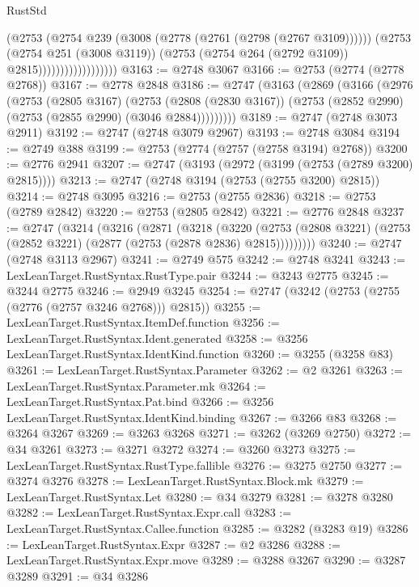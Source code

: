\begin{lexlean}{RustStd}
\begin{coremodule}
                                  (@2753
                                    (@2754 @239 (@3008 (@2778 (@2761 (@2798 (@2767 @3109))))))
                                    (@2753
                                      (@2754 @251 (@3008 @3119))
                                      (@2753 (@2754 @264 (@2792 @3109)) @2815))))))))))))))))))
@3163 := @2748 @3067
@3166 := @2753 (@2774 (@2778 @2768))
@3167 := @2778 @2848
@3186 := @2747
    (@3163
      (@2869
        (@3166
          (@2976
            (@2753
              (@2805 @3167)
              (@2753
                (@2808 (@2830 @3167))
                (@2753 (@2852 @2990) (@2753 (@2855 @2990) (@3046 @2884)))))))))
@3189 := @2747 (@2748 @3073 @2911)
@3192 := @2747 (@2748 @3079 @2967)
@3193 := @2748 @3084
@3194 := @2749 @388
@3199 := @2753 (@2774 (@2757 (@2758 @3194) @2768))
@3200 := @2776 @2941
@3207 := @2747 (@3193 (@2972 (@3199 (@2753 (@2789 @3200) @2815))))
@3213 := @2747 (@2748 @3194 (@2753 (@2755 @3200) @2815))
@3214 := @2748 @3095
@3216 := @2753 (@2755 @2836)
@3218 := @2753 (@2789 @2842)
@3220 := @2753 (@2805 @2842)
@3221 := @2776 @2848
@3237 := @2747
    (@3214
      (@3216
        (@2871
          (@3218
            (@3220
              (@2753 (@2808 @3221) (@2753 (@2852 @3221) (@2877 (@2753 (@2878 @2836) @2815)))))))))
@3240 := @2747 (@2748 @3113 @2967)
@3241 := @2749 @575
@3242 := @2748 @3241
@3243 := LexLeanTarget.RustSyntax.RustType.pair
@3244 := @3243 @2775
@3245 := @3244 @2775
@3246 := @2949 @3245
@3254 := @2747 (@3242 (@2753 (@2755 (@2776 (@2757 @3246 @2768))) @2815))
@3255 := LexLeanTarget.RustSyntax.ItemDef.function
@3256 := LexLeanTarget.RustSyntax.Ident.generated
@3258 := @3256 LexLeanTarget.RustSyntax.IdentKind.function
@3260 := @3255 (@3258 @83)
@3261 := LexLeanTarget.RustSyntax.Parameter
@3262 := @2 @3261
@3263 := LexLeanTarget.RustSyntax.Parameter.mk
@3264 := LexLeanTarget.RustSyntax.Pat.bind
@3266 := @3256 LexLeanTarget.RustSyntax.IdentKind.binding
@3267 := @3266 @83
@3268 := @3264 @3267
@3269 := @3263 @3268
@3271 := @3262 (@3269 @2750)
@3272 := @34 @3261
@3273 := @3271 @3272
@3274 := @3260 @3273
@3275 := LexLeanTarget.RustSyntax.RustType.fallible
@3276 := @3275 @2750
@3277 := @3274 @3276
@3278 := LexLeanTarget.RustSyntax.Block.mk
@3279 := LexLeanTarget.RustSyntax.Let
@3280 := @34 @3279
@3281 := @3278 @3280
@3282 := LexLeanTarget.RustSyntax.Expr.call
@3283 := LexLeanTarget.RustSyntax.Callee.function
@3285 := @3282 (@3283 @19)
@3286 := LexLeanTarget.RustSyntax.Expr
@3287 := @2 @3286
@3288 := LexLeanTarget.RustSyntax.Expr.move
@3289 := @3288 @3267
@3290 := @3287 @3289
@3291 := @34 @3286

\end{coremodule}
\end{lexlean}
